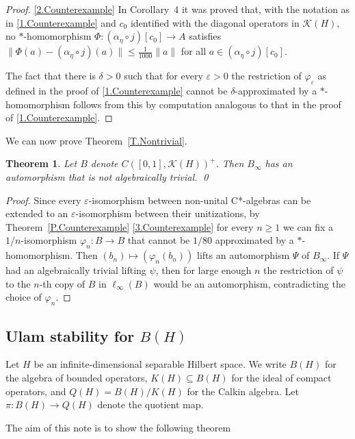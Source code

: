 \documentclass[11pt]{amsproc}
\newcommand{\BH}{B(H)}
\newcommand{\QH}{Q(H)}
\newcommand{\cstar}{C*}
\newcommand{\cK}{\mathcal K}
\theoremstyle{definition}
\theoremstyle{plain}
\newtheorem{theorem}[definition]{Theorem}
\theoremstyle{remark}
\begin{document}
\begin{proof}
	\eqref{2.Counterexample}
	    In Corollary~4 it  was proved that, with the notation as in \eqref{1.Counterexample}   and $c_0$ identified with the 
	   diagonal operators in $\cK(H)$,  no $*$-homomorphism 
	   $\Phi\colon (\alpha_\eta \circ j)[c_0]\to A$ satisfies $\|\Phi(a)-(\alpha_\eta \circ j)(a)\|\leq \frac 1{1000}\|a\|$ for all $a\in (\alpha_\eta \circ j)[c_0]$. 

	
The fact that 	there is $\delta>0$ such that for every $\varepsilon>0$ the restriction of $\varphi_\varepsilon$ as defined in the proof of \eqref{1.Counterexample}  cannot be $\delta$-approximated by a $*$-homomorphism follows from this by computation analogous to that in the proof of \eqref{1.Counterexample}.  
\end{proof}

We can now prove 
Theorem~\ref{T.Nontrivial}. 

\begin{theorem} \label{T.Nontrivial+} Let $B$ denote $C([0,1],\cK(H))^+$. Then $B_\infty$ has an automorphism that is not algebraically trivial. \qed 
\end{theorem}
\begin{proof}
	Since every $\varepsilon$-isomorphism between non-unital \cstar-algebras can be extended  to an $\varepsilon$-isomorphism between their unitizations, by Theorem~\ref{P.Counterexample} \eqref{3.Counterexample} for every $n\geq 1$ we can fix a  $1/n$-isomorphism $\varphi_n\colon B\to B$ that cannot be $1/80$ approximated by a $*$-homomorphism. Then $(b_n)\mapsto (\varphi_n(b_n))$ lifts an automorphism $\Psi$ of $B_\infty$.  If $\Psi$ had an algebraically trivial lifting $\psi$, then for large enough $n$ the restriction of $\psi$ to the $n$-th copy of $B$ in $\ell_\infty(B)$ would be an automorphism, contradicting the choice of $\varphi_n$. 
\end{proof}

\subsection{Ulam stability for $\BH$}\label{S.B(H)}

Let $H$ be an infinite-dimensional separable Hilbert space.
We write $\BH$ for the algebra of bounded operators, $ K(H)\subseteq \BH$ for the ideal of compact operators, and $\QH=\BH/ K(H)$ for the Calkin algebra.
Let $\pi\colon \BH\to \QH$ denote the quotient map.

\medskip

The aim of this note is to show the following theorem
\end{document}
